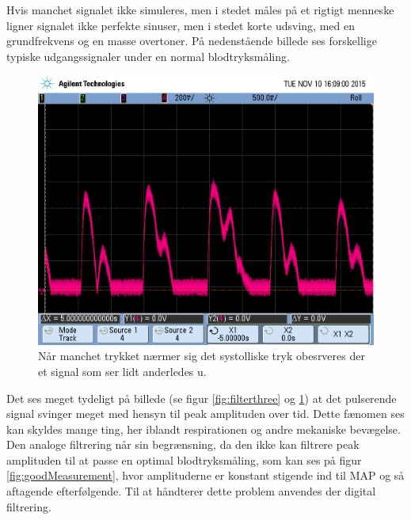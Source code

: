 Hvis manchet signalet ikke simuleres, men i stedet måles på et rigtigt menneske ligner signalet ikke perfekte sinuser, men i stedet korte udsving, med en grundfrekvens og en masse overtoner. På nedenstående billede ses forskellige typiske udgangssignaler under en normal blodtryksmåling.
\newpage

\begin{figure}[H]
	\includegraphics[width=\textwidth]{billeder/scope_2.png}
	\caption{Når manchet trykket nærmer sig det systolliske tryk obesrveres 	der et signal som ser lidt anderledes u.}\label{fig:filterfour}
\end{figure}

Det ses meget tydeligt på billede (se figur \ref{fig:filterthree} og \ref{fig:filterfour}) at det pulserende signal svinger meget med hensyn til peak amplituden over tid. Dette fænomen ses kan skyldes mange ting, her iblandt respirationen og andre mekaniske bevægelse. Den analoge filtrering når sin begrænsning, da den ikke kan filtrere peak amplituden til at passe en optimal blodtryksmåling, som kan ses på figur \ref{fig:goodMeasurement}, hvor amplituderne er konstant stigende ind til MAP og så aftagende efterfølgende. Til at håndterer dette problem anvendes der digital filtrering.
\newpage

